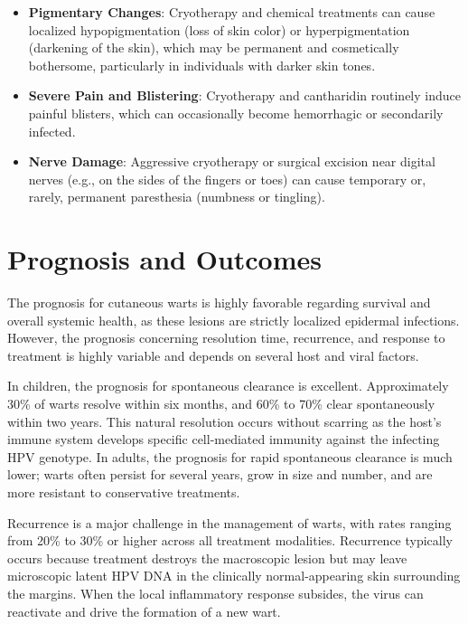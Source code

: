 \begin{itemize}
\begin{itemize}
        \item \textbf{Pigmentary Changes}: Cryotherapy and chemical treatments can cause localized hypopigmentation (loss of skin color) or hyperpigmentation (darkening of the skin), which may be permanent and cosmetically bothersome, particularly in individuals with darker skin tones.
        \item \textbf{Severe Pain and Blistering}: Cryotherapy and cantharidin routinely induce painful blisters, which can occasionally become hemorrhagic or secondarily infected.
        \item \textbf{Nerve Damage}: Aggressive cryotherapy or surgical excision near digital nerves (e.g., on the sides of the fingers or toes) can cause temporary or, rarely, permanent paresthesia (numbness or tingling).
    \end{itemize}
\end{itemize}

\section*{Prognosis and Outcomes}
The prognosis for cutaneous warts is highly favorable regarding survival and overall systemic health, as these lesions are strictly localized epidermal infections. However, the prognosis concerning resolution time, recurrence, and response to treatment is highly variable and depends on several host and viral factors.

In children, the prognosis for spontaneous clearance is excellent. Approximately 30\% of warts resolve within six months, and 60\% to 70\% clear spontaneously within two years. This natural resolution occurs without scarring as the host's immune system develops specific cell-mediated immunity against the infecting HPV genotype. In adults, the prognosis for rapid spontaneous clearance is much lower; warts often persist for several years, grow in size and number, and are more resistant to conservative treatments.

Recurrence is a major challenge in the management of warts, with rates ranging from 20\% to 30\% or higher across all treatment modalities. Recurrence typically occurs because treatment destroys the macroscopic lesion but may leave microscopic latent HPV DNA in the clinically normal-appearing skin surrounding the margins. When the local inflammatory response subsides, the virus can reactivate and drive the formation of a new wart.

